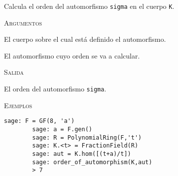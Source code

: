 \begin{description}[leftmargin=1em, font=\ttfamily, style=nextline]
     
    \item[order\_of\_automorphism(K, sigma)]
    
    Calcula el orden del automorfismo \texttt{sigma} en el cuerpo \texttt{K}.

    \textsc{Argumentos}

    \begin{description}[font=\normalfont\ttfamily]
        \item[K] El cuerpo sobre el cual está definido el automorfismo.
        \item[sigma] El automorfismo cuyo orden se va a calcular.
    \end{description}

    \textsc{Salida}

    \begin{description}[font=\normalfont\ttfamily]
        \item[] El orden del automorfismo \texttt{sigma}.
    \end{description}

    \textsc{Ejemplos}

    \begin{lstlisting}[gobble=8]
        sage: F = GF(8, 'a')
        sage: a = F.gen()
        sage: R = PolynomialRing(F,'t')
        sage: K.<t> = FractionField(R)
        sage: aut = K.hom([(t+a)/t])
        sage: order_of_automorphism(K,aut)
        > 7
    \end{lstlisting}     

\end{description}

